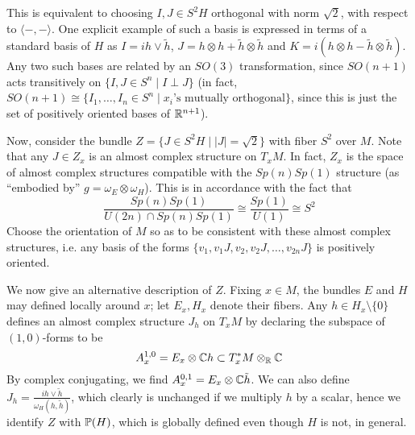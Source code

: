 \documentclass{scrartcl}
\begin{document}
\medskip

This is equivalent to choosing $I,J\in S^2H$ orthogonal with norm $\sqrt 2$, with respect to $\langle -,- \rangle$. One explicit example of such a basis is expressed in terms of a standard basis of $H$ as $I=ih\vee \tilde h$, $J=h\otimes h+\tilde h\otimes \tilde h$ and $K=i(h\otimes h-\tilde h\otimes \tilde h)$. Any two such bases are related by an $SO(3)$ transformation, since $SO(n+1)$ acts transitively on $\{I,J\in S^n\mid I\perp J\}$ (in fact, $SO(n+1)\cong \{I_1,\dots,I_n\in S^n\mid x_i\text{'s mutually orthogonal}\}$, since this is just the set of positively oriented bases of $\R^{n+1}$).

\medskip

Now, consider the bundle $Z=\{J\in S^2 H\mid |J|=\sqrt 2\}$ with fiber $S^2$ over $M$. Note that any $J\in Z_x$ is an almost complex structure on $T_xM$. In fact, $Z_x$ is the space of almost complex structures compatible with the $Sp(n)Sp(1)$ structure (as ``embodied by'' $g=\omega_E\otimes\omega_H$). This is in accordance with the fact that
\begin{equation*}
	\frac{Sp(n)Sp(1)}{U(2n)\cap Sp(n)Sp(1)}\cong \frac{Sp(1)}{U(1)}\cong S^2
\end{equation*}
Choose the orientation of $M$ so as to be consistent with these almost complex structures, i.e. any basis of the forms $\{v_1,v_1J,v_2,v_2 J,\dots,v_{2n}J\}$ is positively oriented.

\medskip

We now give an alternative description of $Z$. Fixing $x\in M$, the bundles $E$ and $H$ may defined locally around $x$; let $E_x,H_x$ denote their fibers. Any $h\in H_x\setminus \{0\}$ defines an almost complex structure $J_h$ on $T_xM$ by declaring the subspace of $(1,0)$-forms to be
\begin{equation}\label{eq:holoforms}
	A^{1,0}_x=E_x\otimes \C h\subset T^*_xM\otimes_\R \C
\end{equation} 
By complex conjugating, we find $A^{0,1}_x=E_x\otimes \C\tilde h$. We can also define $J_h=\frac{ih\vee\tilde h}{\omega_H(h,\tilde h)}$, which clearly is unchanged if we multiply $h$ by a scalar, hence we identify $Z$ with $\P(H)$, which is globally defined even though $H$ is not, in general.

\medskip
\end{document}
